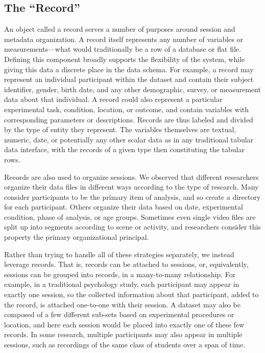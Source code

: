 \documentclass{sig-alternate}
\begin{document}
\subsection{The ``Record''}

An object called a record serves a number of purposes around session and metadata organization.
A record itself represents any number of variables or measurements---what would traditionally be a row of a database or flat file.
Defining this component broadly supports the flexibility of the system, while giving this data a discrete place in the data schema.
For example, a record may represent an individual participant within the dataset and contain their subject identifier, gender, birth date, and any other demographic, survey, or measurement data about that individual.
A record could also represent a particular experimental task, condition, location, or outcome, and contain variables with corresponding parameters or descriptions.
Records are thus labeled and divided by the type of entity they represent.
The variables themselves are textual, numeric, date, or potentially any other scalar data as in any traditional tabular data interface, with the records of a given type then constituting the tabular rows.

Records are also used to organize sessions.
We observed that different researchers organize their data files in different ways according to the type of research.
Many consider participants to be the primary item of analysis, and so create a directory for each participant.
Others organize their data based on date, experimental condition, phase of analysis, or age groups.
Sometimes even single video files are split up into segments according to scene or activity, and researchers consider this property the primary organizational principal.

Rather than trying to handle all of these strategies separately, we instead leverage records.
That is, records can be attached to sessions, or, equivalently, sessions can be grouped into records, in a many-to-many relationship.
For example, in a traditional psychology study, each participant may appear in exactly one session, so the collected information about that participant, added to the record, is attached one-to-one with their session.
A dataset may also be composed of a few different sub-sets based on experimental procedures or location, and here each session would be placed into exactly one of these few records.
In some research, multiple participants may also appear in multiple sessions, such as recordings of the same class of students over a span of time.
\end{document}
